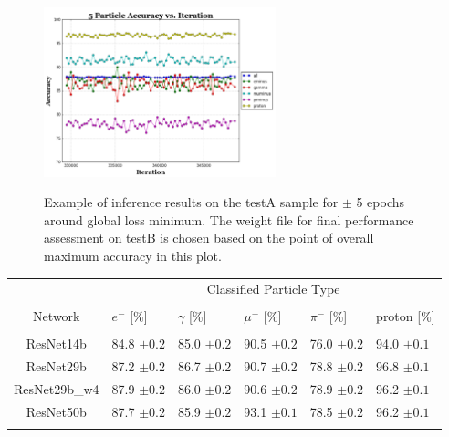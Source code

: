 \documentclass[11pt,a4paper]{article}
\begin{document}
\begin{figure}[t]
  \centering  
\includegraphics[width=0.6\textwidth]{Figures/testAinference.png}\\
\caption{Example of inference results on the testA sample for $\pm$ 5 epochs around global loss minimum. The weight file for final performance assessment on testB is chosen based on the point of overall maximum accuracy in this plot. }
  \label{fig:inferenceA}
\end{figure}

\par \noindent
\vspace{2 mm}
\begin{minipage}{\linewidth}
\centering
{} \label{tab:classCompare} 
\begin{tabular}{clllll}
 & \multicolumn{5}{c}{Classified Particle Type} \\
\cline{2-6}
\vspace{-0.1in}\\
\vspace{0.05in}
Network & $e^-$ [\%] & $\gamma$ [\%] & $\mu^-$ [\%] & $\pi^-$ [\%] & proton [\%] \\
\hline 
\vspace{-0.1in}\\
\vspace{0.05in}
 ResNet14b & 84.8 $\pm 0.2$ & 85.0 $\pm 0.2$  & 90.5 $\pm 0.2$ & 76.0 $\pm 0.2$ & 94.0 $\pm 0.1$ \\ 
 \vspace{0.05in}
 ResNet29b & 87.2 $\pm 0.2$ & 86.7 $\pm 0.2$  & 90.7 $\pm 0.2$ & 78.8 $\pm 0.2$ & 96.8 $\pm 0.1$ \\ 
 \vspace{0.05in}
 ResNet29b\_w4 & 87.9 $\pm 0.2 $ & 86.0 $\pm 0.2$  & 90.6 $\pm 0.2$ & 78.9 $\pm 0.2$ & 96.2 $\pm 0.1$ \\ 
 \vspace{0.05in}
 ResNet50b & 87.7 $\pm 0.2$ & 85.9 $\pm 0.2$  & 93.1 $\pm 0.1$ & 78.5 $\pm 0.2$ & 96.2 $\pm 0.1$ \\ 
 \vspace{0.05in}
    \end{tabular}
\end{minipage}
\end{document}
